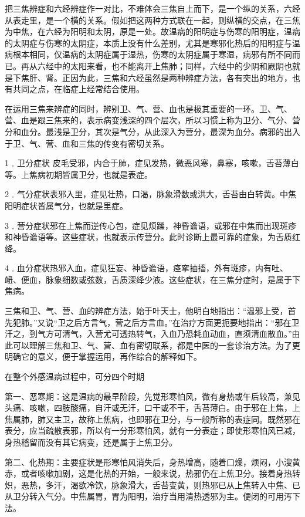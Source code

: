 \documentclass[12pt,UTF8]{ctexbook}
\begin{document}
把三焦辨症和六经辨症作一对比，不难体会三焦自上而下，是一个纵的关系，六经从表走里，是一个横的关系。假如把这两种方式联在一起，则纵横的交点，在三焦为中焦，在六经为阳明和太阴，原是一处。故温病的阳明症与伤寒的阳明症，温病的太阴症与伤寒的太阴症，本质上没有什么差别，尤其是寒邪化热后的阳明症与温病根本相同，仅温病的太阴症属于湿热，伤寒的太阴症属于寒湿，病邪有所不同而已。再从六经中的太阳来看，也不能离开上焦肺；同样，六经中的少阴和厥阴也就是下焦肝、肾。正因为此，三焦和六经虽然是两种辨症方法，各有突出的地方，也有共同之点，在临症上经常结合使用。

在运用三焦来辨症的同时，辨别卫、气、营、血也是极其重要的一环。卫、气、营、血是跟三焦来的，表示病变浅深的四个层次，所以习惯上称为卫分、气分、营分和血分。最浅是卫分，其次是气分，从此深入为营分，最深为血分。病邪的出入于卫、气、营、血和三焦的传变有密切关系。

1﹒卫分症状 皮毛受邪，内合于肺，症见发热，微恶风寒，鼻塞，咳嗽，舌苔薄白等。上焦病初期皆属卫分，也就是表症。

2﹒气分症状表邪入里，症见壮热，口渴，脉象滑数或洪大，舌苔由白转黄。中焦阳明症状皆属气分，也就是里症。

3﹒营分症状邪在上焦而逆传心包，症见烦躁，神昏谵语，或邪在中焦而出现斑疹和神昏谵语等。这些症状，也就表示传营分。此时诊断上最可靠的症象，为舌质红绛。

4﹒血分症状热邪入血，症见狂妄、神昏谵语，痉挛抽搐，外有斑疹，内有吐、衄、便血，脉象细数或弦数，舌质深绛少液。这些症状，在三焦分症时，是属于下焦病。

三焦和卫、气、营、血的辨症方法，始于叶天士，他明白地指出：“温邪上受，首先犯肺。”又说“卫之后方言气，营之后方言血。”在治疗方面更扼要地指出：“邪在卫汗之，到气方可清气，入营尤可透热转气，入血乃恐耗血动血，直须清血散血。”由此可以理解三焦和卫、气、营、血有密切联系，都是中医的一套诊治方法。为了更明确它的意义，便于掌握运用，再作综合的解释如下。

在整个外感温病过程中，可分四个时期

第一、恶寒期：这是温病的最早阶段，先觉形寒怕风，微有身热或午后较高，兼见头痛、咳嗽，四肢酸痛，自汗或无汗，口干或不干，舌苔薄白。由于邪在上焦，上焦属肺，肺又主卫，故称上焦病，也即邪在卫分，与一般所称的表症同。既然邪在表分，应当疏散表邪，所以有一分形寒怕风，就有一分表症；即使形寒怕风已减，身热稽留而没有其它病变，还是属于上焦卫分。

第二、化热期：主要症状是形寒怕风消失后，身热增高，随着口燥，烦闷，小溲黄赤，或者咳嗽加剧，这是化热的开始，一般来说，热邪仍在上焦卫分。接着身热转炽，恶热，多汗，渴欲冷饮，脉象滑大，舌苔变黄，则热邪已从上焦转入中焦、已从卫分转入气分。中焦属胃，胃为阳明，治疗当用清热透邪为主。便闭的可用泻下法。
\end{document}
